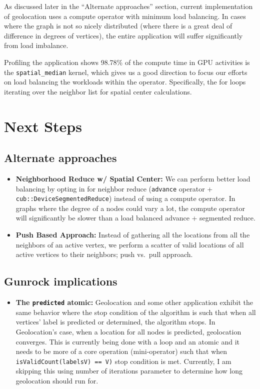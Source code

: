 \documentclass[10pt,article,oneside]{memoir}
\begin{document}
As discussed later in the ``Alternate approaches'' section, current
implementation of geolocation uses a compute operator with minimum load
balancing. In cases where the graph is not so nicely distributed (where
there is a great deal of difference in degrees of vertices), the entire
application will suffer significantly from load imbalance.

Profiling the application shows 98.78\% of the compute time in GPU
activities is the \texttt{spatial\_median} kernel, which gives us a good
direction to focus our efforts on load balancing the workloads within
the operator. Specifically, the for loops iterating over the neighbor
list for spatial center calculations.

\section{Next Steps}\label{next-steps}

\subsection{Alternate approaches}\label{alternate-approaches}

\begin{itemize}
\item
  \textbf{Neighborhood Reduce w/ Spatial Center:} We can perform better
  load balancing by opting in for neighbor reduce (\texttt{advance}
  operator + \texttt{cub::DeviceSegmentedReduce}) instead of using a
  compute operator. In graphs where the degree of a nodes could vary a
  lot, the compute operator will significantly be slower than a load
  balanced advance + segmented reduce.
\item
  \textbf{Push Based Approach:} Instead of gathering all the locations
  from all the neighbors of an active vertex, we perform a scatter of
  valid locations of all active vertices to their neighbors; push
  vs.~pull approach.
\end{itemize}

\subsection{Gunrock implications}\label{gunrock-implications}

\begin{itemize}
\itemsep1pt\parskip0pt
\item
  \textbf{The \texttt{predicted} atomic:} Geolocation and some other
  application exhibit the same behavior where the stop condition of the
  algorithm is such that when all vertices' label is predicted or
  determined, the algorithm stops. In Geolocation's case, when a
  location for all nodes is predicted, geolocation converges. This is
  currently being done with a loop and an atomic and it needs to be more
  of a core operation (mini-operator) such that when
  \texttt{isValidCount(labels\textbar{}V\textbar{})\ ==\ \textbar{}V\textbar{})}
  stop condition is met. Currently, I am skipping this using number of
  iterations parameter to determine how long geolocation should run for.
\end{itemize}
\end{document}
